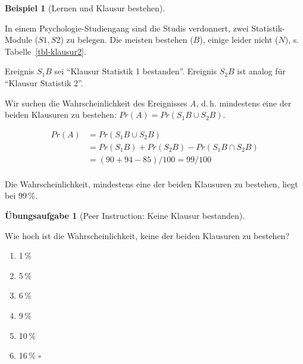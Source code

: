 \documentclass[
  ngerman,
  letterpaper,
  twoside,
  open=any]{scrbook}
\providecommand{\tightlist}{%
  \setlength{\itemsep}{0pt}\setlength{\parskip}{0pt}}\usepackage{longtable,booktabs,array}
\theoremstyle{definition}
\newtheorem{example}{Beispiel}[chapter]
\theoremstyle{plain}
\theoremstyle{definition}
\newtheorem{exercise}{Übungsaufgabe}[chapter]
\theoremstyle{definition}
\theoremstyle{definition}
\newtheorem{example}{Beispiel}[chapter]
\theoremstyle{definition}
\newtheorem{exercise}{Übungsaufgabe}[chapter]
\theoremstyle{remark}
\begin{document}
\begin{example}[Lernen und Klausur
bestehen]\protect\hypertarget{exm-klausur-bed-wskt}{}\label{exm-klausur-bed-wskt}

In einem Psychologie-Studiengang sind die Studis verdonnert, zwei
Statistik-Module (\(S1, S2\)) zu belegen. Die meisten bestehen (\(B\)),
einige leider nicht (\(N\)), s. Tabelle~\ref{tbl-klausur2}.

Ereignis \(S_1B\) sei \enquote{Klausur Statistik 1 bestanden}. Ereignis
\(S_2B\) ist analog für \enquote{Klausur Statistik 2}.

Wir suchen die Wahrscheinlichkeit des Ereignisses \emph{A}, d.\,h.
mindestens eine der beiden Klausuren zu bestehen:
\(Pr(A) = Pr(S_1B \cup S_2B)\).

\begin{table}

\caption{\label{tbl-klausur2}Daten von 100 Studis; L: Lerner, B:
Bestanden, N: Negation/Nicht}


\end{table}%

\begin{align}
Pr(A) &= Pr(S_1B \cup S_2B) \\
&= Pr(S_1B) + Pr(S_2B) - Pr(S_1B \cap S_2B)  \\
&= (90 + 94 - 85) / 100 = 99 / 100\\
\end{align}

Die Wahrscheinlichkeit, mindestens eine der beiden Klausuren zu
bestehen, liegt bei 99\,\%.

\begin{exercise}[Peer Instruction: Keine Klausur
bestanden]\protect\hypertarget{exr-keine-klausur-bestanden}{}\label{exr-keine-klausur-bestanden}

Wie hoch ist die Wahrscheinlichkeit, keine der beiden Klausuren zu
bestehen?

\begin{enumerate}
\def\labelenumi{\Alph{enumi})}
\tightlist
\item
  1\,\%
\item
  5\,\%
\item
  6\,\%
\item
  9\,\%
\item
  10\,\%
\item
  16\,\% \(\square\)
\end{enumerate}

\end{exercise}

\end{example}
\end{document}
